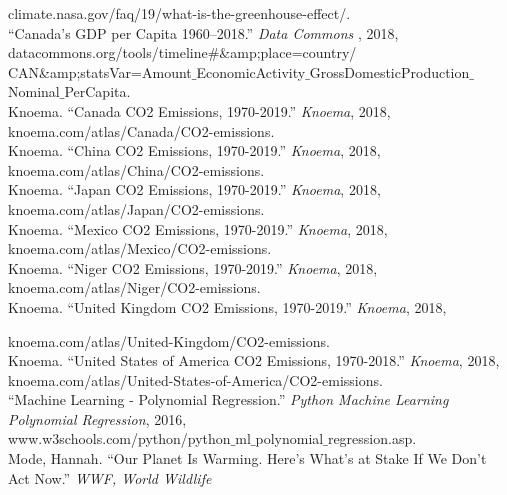 \documentclass[fontsize=11pt]{article}
\begin{document}
    climate.nasa.gov/faq/19/what-is-the-greenhouse-effect/. \\
    \newline
    “Canada's GDP per Capita 1960–2018.” \textit{Data Commons} , 2018, datacommons.org/tools/timeline\#\&amp;place=country/ \\

    CAN&amp;statsVar=Amount$\_$EconomicActivity$\_$GrossDomesticProduction$\_$Nominal$\_$PerCapita. \\
    \newline
    Knoema. “Canada CO2 Emissions, 1970-2019.” \textit{Knoema}, 2018, knoema.com/atlas/Canada/CO2-emissions.  \\
    \newline
    Knoema. “China CO2 Emissions, 1970-2019.” \textit{Knoema}, 2018, knoema.com/atlas/China/CO2-emissions. \\
    \newline
    Knoema. “Japan CO2 Emissions, 1970-2019.” \textit{Knoema}, 2018, knoema.com/atlas/Japan/CO2-emissions.  \\
    \newline
    Knoema. “Mexico CO2 Emissions, 1970-2019.” \textit{Knoema}, 2018, knoema.com/atlas/Mexico/CO2-emissions.  \\
    \newline
    Knoema. “Niger CO2 Emissions, 1970-2019.” \textit{Knoema}, 2018, knoema.com/atlas/Niger/CO2-emissions.  \\
    \newline
    Knoema. “United Kingdom CO2 Emissions, 1970-2019.” \textit{Knoema}, 2018,   \\

    \newline

    knoema.com/atlas/United-Kingdom/CO2-emissions. \\
    \newline
    Knoema. “United States of America CO2 Emissions, 1970-2018.” \textit{Knoema}, 2018, \\

    \newline
    knoema.com/atlas/United-States-of-America/CO2-emissions. \\
    \newline
    “Machine Learning - Polynomial Regression.” \textit{Python Machine Learning Polynomial Regression}, 2016, \\

    www.w3schools.com/python/python$\_$ml$\_$polynomial$\_$regression.asp. \\
    \newline
    Mode, Hannah. “Our Planet Is Warming. Here's What's at Stake If We Don't Act Now.” \textit{WWF, World Wildlife} \\
\end{document}
